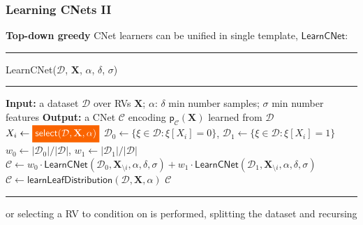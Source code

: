 \documentclass[xcolor={usenames,dvipsnames,svgnames}, compress]{beamer}
\newcommand{\highlight}[2][yellow]{\mathchoice%
  {\colorbox{#1}{\strut\textcolor{white}{$\displaystyle{#2}$}}}%
  {\colorbox{#1}{\strut\textcolor{white}{$\textstyle{#2}$}}}%
  {\colorbox{#1}{\strut\textcolor{white}{$\scriptstyle{#2}$}}}%
  {\colorbox{#1}{\strut\textcolor{white}{$\scriptscriptstyle{#2}$}}}}%
\begin{document}
\begin{frame}[t]
  \frametitle{Learning CNets II}
  \small
      \textbf{Top-down greedy} CNet learners %
    can be unified in single template, $\mathsf{LearnCNet}$:\vspace{-10pt}
 \begin{center}  
  \begin{minipage}{0.9\linewidth}
    \vspace{10pt}
        \scriptsize
        {\hrule\flushleft\textsf{LearnCNet}($\mathcal{D}$, $\mathbf{X}$, $\alpha$,
        $\delta$, $\sigma$)\\\hrule}
  \begin{algorithmic}[1]
    \State \textbf{Input:} a dataset $\mathcal{D}$ over RVs $\mathbf{X}$; $\alpha$: $\delta$
    min number samples; $\sigma$ min number features
    \State  \textbf{Output:}  a CNet $\mathcal{C}$ encoding  $\mathsf{p}_{\mathcal{C}}(\textbf{X})$ learned from $\mathcal D$
    \State $X_i\leftarrow  \highlight[gold4]{\mathsf{select}(\mathcal D, \mathbf X, \alpha)}$
    \State $\mathcal D_0 \leftarrow \{\xi \in \mathcal D: \xi[X_i]=0 \}$, $\mathcal D_1 \leftarrow \{\xi \in \mathcal D: \xi[X_i]=1 \}$
    \State $w_0 \leftarrow |\mathcal D_0| / |\mathcal D|$, $w_1 \leftarrow |\mathcal   D_1| / |\mathcal D|$
    \State $\mathcal{C} \leftarrow
    w_0\cdot\mathsf{LearnCNet}(\mathcal D_0, \mathbf X_{\setminus i},
    \alpha, \delta, \sigma) + w_1 \cdot\mathsf{LearnCNet}(\mathcal D_1, \mathbf X_{\setminus i}, \alpha, \delta, \sigma) $
    \Else 
    \State $\mathcal{C} \leftarrow \mathsf{learnLeafDistribution}(\mathcal D, \mathbf X, \alpha)$
    \EndIf
    \State \Return $\mathcal{C}$
  \end{algorithmic}
  \hrule
\end{minipage}
\end{center}
\vspace{10pt}
  \small
  or selecting a RV to condition on is performed, splitting the
  dataset and recursing
\end{frame}
\end{document}
